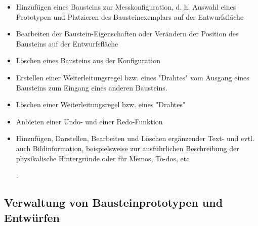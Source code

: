 \documentclass[parskip=full]{scrartcl}
\begin{document}
\begin{itemize}
	
	\item 
	\begin{MussKrit} 			
		Hinzufügen eines Bausteins zur Messkonfiguration, d. h. Auswahl eines Prototypen und Platzieren des Bausteinexemplars auf der Entwurfsfläche
	\end{MussKrit}
	
	\item 
	\begin{MussKrit} 		
		Bearbeiten der Baustein-Eigenschaften oder Verändern der Position des Bausteins auf der Entwurfsfläche 	
	\end{MussKrit}
	
	\item 
	\begin{MussKrit} 			
		Löschen eines Bausteins aus der Konfiguration
	\end{MussKrit}
	
	\item 
	\begin{MussKrit} 			
		Erstellen einer Weiterleitungsregel bzw. eines "Drahtes" vom Ausgang eines Bausteins zum Eingang eines anderen Bausteins. 
	\end{MussKrit}
	
	\item 
	\begin{MussKrit} 			
		Löschen einer Weiterleitungsregel bzw. eines "Drahtes"
	\end{MussKrit}
	
	\item 
	\begin{SollKrit} 			
		Anbieten einer Undo- und einer Redo-Funktion
	\end{SollKrit}
			
	\item 
	\begin{WunschKrit} 
		Hinzufügen, Darstellen, Bearbeiten und Löschen ergänzender Text- und evtl. auch Bildinformation, beispielsweise zur ausführlichen Beschreibung der physikalische Hintergründe oder für Memos, To-dos, etc
	\end{WunschKrit}.
	
\end{itemize}

\subsection{Verwaltung von Bausteinprototypen und Entwürfen}
\end{document}
